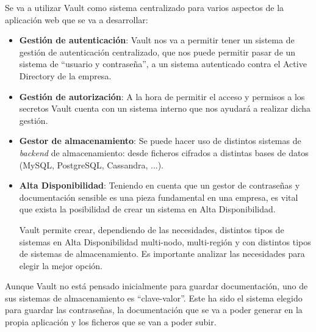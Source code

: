 \documentclass{\ClassPath/viu-tfm-template}
\begin{document}
Se va a utilizar Vault como sistema centralizado para varios aspectos de la aplicación web que se va a desarrollar:

\begin{itemize}
    \item \textbf{Gestión de autenticación}: Vault nos va a permitir tener un sistema de gestión de autenticación centralizado, que nos puede permitir pasar de un sistema de “usuario y contraseña”, a un sistema autenticado contra el Active Directory de la empresa.

    \item \textbf{Gestión de autorización}: A la hora de permitir el acceso y permisos a los secretos Vault cuenta con un sistema interno que nos ayudará a realizar dicha gestión.

    \item \textbf{Gestor de almacenamiento}: Se puede hacer uso de distintos sistemas de \textit{backend} de almacenamiento: desde ficheros cifrados a distintas bases de datos (MySQL, PostgreSQL, Cassandra, ...).


    \item \textbf{Alta Disponibilidad}: Teniendo en cuenta que un gestor de contraseñas y documentación sensible es una pieza fundamental en una empresa, es vital que exista la posibilidad de crear un sistema en Alta Disponibilidad.

    Vault permite crear, dependiendo de las necesidades, distintos tipos de sistemas en Alta Disponibilidad multi-nodo, multi-región y con distintos tipos de sistemas de almacenamiento. Es importante analizar las necesidades para elegir la mejor opción.

\end{itemize}
Aunque Vault no está pensado inicialmente para guardar documentación, uno de sus sistemas de almacenamiento es “clave-valor”.  Este ha sido el sistema elegido para guardar las contraseñas, la documentación que se va a poder generar en la propia aplicación y los ficheros que se van a poder subir.
\end{document}
